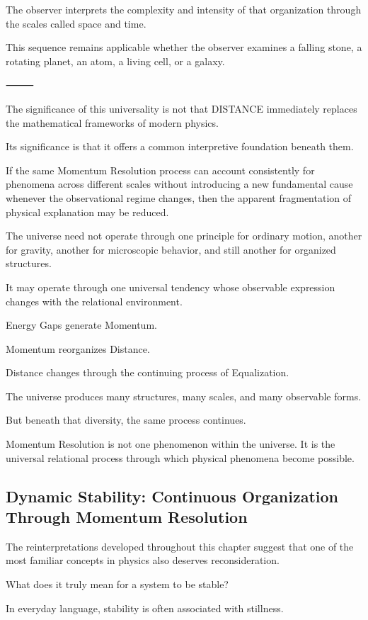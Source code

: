 The observer interprets the complexity and intensity of that organization through the scales called space and time.

This sequence remains applicable whether the observer examines a falling stone, a rotating planet, an atom, a living cell, or a galaxy.

⸻

The significance of this universality is not that DISTANCE immediately replaces the mathematical frameworks of modern physics.

Its significance is that it offers a common interpretive foundation beneath them.

If the same Momentum Resolution process can account consistently for phenomena across different scales without introducing a new fundamental cause whenever the observational regime changes, then the apparent fragmentation of physical explanation may be reduced.

The universe need not operate through one principle for ordinary motion, another for gravity, another for microscopic behavior, and still another for organized structures.

It may operate through one universal tendency whose observable expression changes with the relational environment.

Energy Gaps generate Momentum.

Momentum reorganizes Distance.

Distance changes through the continuing process of Equalization.

The universe produces many structures, many scales, and many observable forms.

But beneath that diversity, the same process continues.

Momentum Resolution is not one phenomenon within the universe. It is the universal relational process through which physical phenomena become possible.

\subsection*{\textbf{Dynamic Stability: Continuous Organization Through Momentum Resolution}}

The reinterpretations developed throughout this chapter suggest that one of the most familiar concepts in physics also deserves reconsideration.

What does it truly mean for a system to be stable?

In everyday language, stability is often associated with stillness.

